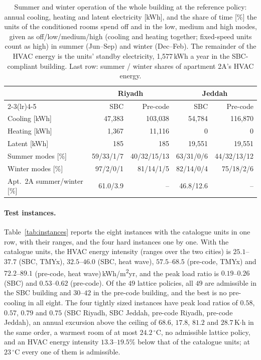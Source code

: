 \documentclass[10pt,a4paper,twocolumn]{article}
\theoremstyle{definition}
\begin{document}
\begin{table}[t]
\centering\footnotesize\setlength{\tabcolsep}{3pt}
\caption{Summer and winter operation of the whole building at the reference policy: annual cooling, heating and latent electricity [kWh], and the share of time [\%] the units of the conditioned rooms spend off and in the low, medium and high modes, given as off/low/medium/high (cooling and heating together; fixed-speed units count as high) in summer (Jun--Sep) and winter (Dec--Feb). The remainder of the HVAC energy is the units' standby electricity, 1{,}577\,kWh a year in the SBC-compliant building. Last row: summer / winter shares of apartment 2A's HVAC energy.}
\label{S:seasons}
\begin{tabularx}{\linewidth}{@{}X r r r r@{}}
\toprule
 & \multicolumn{2}{c}{Riyadh} & \multicolumn{2}{c}{Jeddah} \\
\cmidrule(lr){2-3}\cmidrule(lr){4-5}
 & SBC & Pre-code & SBC & Pre-code \\
\midrule
Cooling [kWh] & 47{,}383 & 103{,}038 & 54{,}784 & 116{,}870 \\
Heating [kWh] & 1{,}367 & 11{,}116 & 0 & 0 \\
Latent [kWh] & 185 & 185 & 19{,}551 & 19{,}551 \\
Summer modes [\%] & 59/33/1/7 & 40/32/15/13 & 63/31/0/6 & 44/32/13/12 \\
Winter modes [\%] & 97/2/0/1 & 81/14/1/5 & 82/14/0/4 & 75/18/2/6 \\
Apt.~2A summer/winter [\%] & 61.0/3.9 & -- & 46.8/12.6 & -- \\
\bottomrule
\end{tabularx}
\end{table}

\paragraph{Test instances.} Table~\ref{tab:instances} reports the eight instances with the catalogue units in one row, with their ranges, and the four hard instances one by one. With the catalogue units, the HVAC energy intensity (ranges over the two cities) is $25.1$--$37.7$ (SBC, TMYx), $32.5$--$46.0$ (SBC, heat wave), $57.5$--$68.5$ (pre-code, TMYx) and $72.2$--$89.1$ (pre-code, heat wave)\,kWh/m\textsuperscript{2}yr, and the peak load ratio is $0.19$--$0.26$ (SBC) and $0.53$--$0.62$ (pre-code). Of the $49$ lattice policies, all $49$ are admissible in the SBC building and $30$--$42$ in the pre-code building, and the best is no pre-cooling in all eight. The four tightly sized instances have peak load ratios of $0.58$, $0.57$, $0.79$ and $0.75$ (SBC Riyadh, SBC Jeddah, pre-code Riyadh, pre-code Jeddah), an annual excursion above the ceiling of $68.6$, $17.8$, $81.2$ and $28.7$\,K$\cdot$h in the same order, a warmest room of at most $24.2\,^{\circ}$C, no admissible lattice policy, and an HVAC energy intensity $13.3$--$19.5$\% below that of the catalogue units; at $23\,^{\circ}$C every one of them is admissible.
\end{document}
